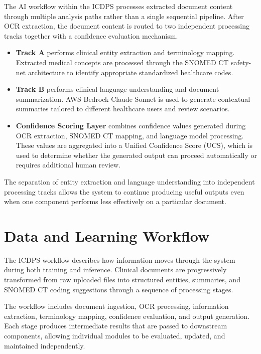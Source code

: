 The AI workflow within the ICDPS processes extracted document content through multiple analysis paths rather than a single sequential pipeline. After OCR extraction, the document content is routed to two independent processing tracks together with a confidence evaluation mechanism.

\begin{itemize}

\item \textbf{Track A} performs clinical entity extraction and terminology mapping. Extracted medical concepts are processed through the SNOMED CT safety-net architecture to identify appropriate standardized healthcare codes.

\item \textbf{Track B} performs clinical language understanding and document summarization. AWS Bedrock Claude Sonnet is used to generate contextual summaries tailored to different healthcare users and review scenarios.

\item \textbf{Confidence Scoring Layer} combines confidence values generated during OCR extraction, SNOMED CT mapping, and language model processing. These values are aggregated into a Unified Confidence Score (UCS), which is used to determine whether the generated output can proceed automatically or requires additional human review.

\end{itemize}

The separation of entity extraction and language understanding into independent processing tracks allows the system to continue producing useful outputs even when one component performs less effectively on a particular document.

\section{Data and Learning Workflow}

The ICDPS workflow describes how information moves through the system during both training and inference. Clinical documents are progressively transformed from raw uploaded files into structured entities, summaries, and SNOMED CT coding suggestions through a sequence of processing stages.

The workflow includes document ingestion, OCR processing, information extraction, terminology mapping, confidence evaluation, and output generation. Each stage produces intermediate results that are passed to downstream components, allowing individual modules to be evaluated, updated, and maintained independently.

